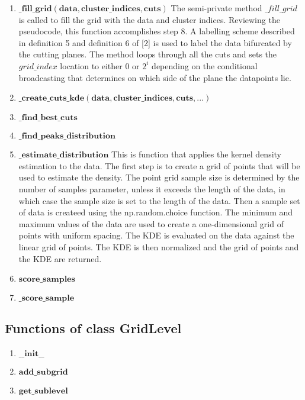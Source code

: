 \begin{enumerate}
    \item $\mathbf{\_fill\_grid(data, cluster\_indices,cuts)}$\newline
    {The semi-private method $\_fill\_grid$ is called to fill the grid with the data and cluster indices. Reviewing the pseudocode, this function accomplishes step 8. 
    A labelling scheme described in definition 5 and definition 6 of [2] is used to label the data bifurcated by the cutting planes. 
    The method loops through all the cuts and sets the $grid\_index$ location to either 0 or ${2^i}$ depending on the conditional broadcasting that determines on which side of the plane the datapoints lie.}
    \item $\mathbf{\_create\_cuts\_kde(data, cluster\_indices,cuts,  ... )}$\newline
    {}
    \item $\mathbf{\_find\_best\_cuts}$\newline
    {}
    \item $\mathbf{\_find\_peaks\_distribution}$\newline
    {}
    \item $\mathbf{\_estimate\_distribution}$\newline
    {This is function that applies the kernel density estimation to the data. The first step is to create a grid of points that will be used to estimate the density. 
    The point grid sample size is determined by the number of samples parameter, unless it exceeds the length of the data, in which case the sample size is set to the length of the data.
    Then a sample set of data is createed using the np.random.choice function. The minimum and maximum values of the data are used to create a one-dimensional grid of points with uniform spacing.
    The KDE is evaluated on the data against the linear grid of points. The KDE is then normalized and the grid of points and the KDE are returned.}
    \item $\mathbf{score\_samples}$\newline
    {}
    \item $\mathbf{\_score\_sample}$\newline
    {}
\end{enumerate}

\subsection{Functions of class GridLevel}
\begin{enumerate}    
    \item $\mathbf{\_\_init\_\_}$\newline
    {}
    \item $\mathbf{add\_subgrid}$\newline
    {}
    \item $\mathbf{get\_sublevel}$\newline
    {}
\end{enumerate}



